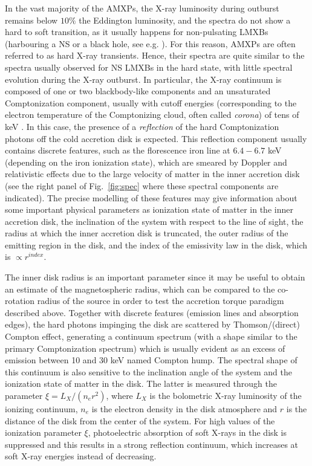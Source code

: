 \documentclass[graybox]{svmult}
\begin{document}
In the vast majority of the AMXPs, the X-ray luminosity during outburst remains below $10\%$ the Eddington luminosity, and the spectra do not show a hard to soft transition, as it usually happens for non-pulsating LMXBs (harbouring a NS or a black hole, see e.g. \cite{Done2007}). For this reason, AMXPs are often referred to as hard X-ray transients. Hence, their spectra are quite similar to the spectra usually observed for NS LMXBs in the hard state, with little spectral evolution during the X-ray outburst. In particular, the X-ray continuum is composed of one or two blackbody-like components and an unsaturated Comptonization component, usually with cutoff energies (corresponding to the electron temperature of the Comptonizing cloud, often called {\it corona}) of tens of keV \cite{Gierlinski2002,Gierlinski2005,Poutanen2006}. In this case, the presence of a {\it reflection} of the hard Comptonization photons off the cold accretion disk is expected. This reflection component usually contains discrete features, such as the florescence iron line at $6.4 - 6.7$ keV (depending on the iron ionization state), which are smeared by Doppler and relativistic effects due to the large velocity of matter in the inner accretion disk (see the right panel of Fig.~\ref{fig:spec} where these spectral components are indicated). The precise modelling of these features may give information about some important physical parameters as ionization state of matter in the inner accretion disk, the inclination of the system with respect to the line of sight, the radius at which the inner accretion disk is truncated, the outer radius of the emitting region in the disk, and the index of the emissivity law in the disk, which is $\propto r^{index}$. 

The inner disk radius is an important parameter since it may be useful to obtain an estimate of the magnetospheric radius, which can be compared to the co-rotation radius of the source in order to test the accretion torque paradigm described above. Together with discrete features (emission lines and absorption edges), the hard photons impinging the disk are scattered by Thomson/(direct) Compton effect, generating a continuum spectrum (with a shape similar to the primary Comptonization spectrum) which is usually evident as an excess of emission between 10 and 30 keV named Compton hump. The spectral shape of this continuum is also sensitive to the inclination angle of the system and the ionization state of matter in the disk. The latter is measured through the parameter $\xi = L_X/(n_e r^2)$, where $L_X$ is the bolometric X-ray luminosity of the ionizing continuum, $n_e$ is the electron density in the disk atmosphere and $r$ is the distance of the disk from the center of the system. For high values of the ionization parameter $\xi$, photoelectric absorption of soft X-rays in the disk is suppressed and this results in a strong reflection continuum, which increases at soft X-ray energies instead of decreasing.
\end{document}
